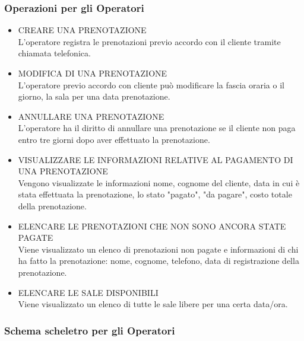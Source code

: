 \documentclass{article}
\newcounter{counteroperazioni}
\newcommand{\coperazioni}{\addtocounter{counteroperazioni}{1}\thecounteroperazioni}
\begin{document}
\subsubsection{Operazioni per gli Operatori}
\begin{itemize}[labelindent=1.5em,labelsep=.5cm,leftmargin=*]
    \item [\textbf{O\coperazioni)}] CREARE UNA PRENOTAZIONE \\ L'operatore registra le prenotazioni previo accordo con il cliente tramite chiamata telefonica.
    \item [\textbf{O\coperazioni)}] MODIFICA DI UNA PRENOTAZIONE\\ L'operatore previo accordo con cliente può modificare la fascia oraria o il giorno, la sala per una data prenotazione.
    \item [\textbf{O\coperazioni)}] ANNULLARE UNA PRENOTAZIONE \\ L'operatore ha il diritto di annullare una prenotazione se il cliente non paga entro tre giorni dopo aver effettuato la prenotazione.
    \item [\textbf{O\coperazioni)}] VISUALIZZARE LE INFORMAZIONI RELATIVE AL PAGAMENTO DI UNA PRENOTAZIONE \\ Vengono visualizzate le informazioni nome, cognome del cliente, data in cui è stata effettuata la prenotazione, lo stato "pagato", "da pagare", costo totale della prenotazione. 
    \item [\textbf{O\coperazioni)}] ELENCARE LE PRENOTAZIONI CHE NON SONO ANCORA STATE PAGATE \\ Viene visualizzato un elenco di prenotazioni non pagate e informazioni di chi ha fatto la prenotazione: nome, cognome, telefono, data di registrazione della prenotazione.
    \item [\textbf{O\coperazioni)}] ELENCARE LE SALE DISPONIBILI \\ Viene visualizzato un elenco di tutte le sale libere per una certa data/ora.
\end{itemize}

\subsubsection{Schema scheletro per gli Operatori}
\begin{center}
    
\end{center}
\end{document}
